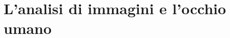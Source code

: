 \documentclass[12 pt]{article}
\begin{document}

\tableofcontents

\section{L'analisi di immagini e l'occhio umano}

\end{document}
